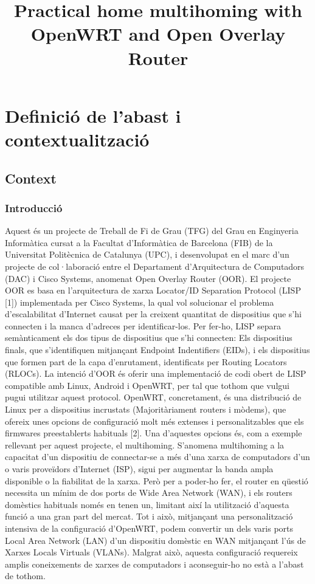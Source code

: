 \documentclass{article}
\begin{document}
\title{Practical home multihoming with OpenWRT and Open Overlay Router}
\maketitle
\tableofcontents
\section{Definició de l’abast i contextualització}
\subsection{Context}
\subsubsection{Introducció}
Aquest és un projecte de Treball de Fi de Grau (TFG) del Grau en Enginyeria Informàtica cursat a la Facultat d’Informàtica de Barcelona (FIB) de la Universitat Politècnica de Catalunya (UPC), i desenvolupat en el marc d’un projecte de col·laboració entre el Departament d’Arquitectura de Computadors (DAC) i Cisco Systems, anomenat Open Overlay Router (OOR).
El projecte OOR es basa en l’arquitectura de xarxa Locator/ID Separation Protocol (LISP [1]) implementada per Cisco Systems, la qual vol solucionar el problema d’escalabilitat d’Internet causat per la creixent quantitat de dispositius que s’hi connecten i la manca d’adreces per identificar-los. Per fer-ho, LISP separa semànticament els dos tipus de dispositius que s’hi connecten: Els dispositius finals, que s’identifiquen mitjançant Endpoint Indentifiers (EIDs), i els dispositius que formen part de la capa d’enrutament, identificats per Routing Locators (RLOCs).
La intenció d’OOR és oferir una implementació de codi obert de LISP compatible amb Linux, Android i OpenWRT, per tal que tothom que vulgui pugui utilitzar aquest protocol.
OpenWRT, concretament, és una distribució de Linux per a dispositius incrustats (Majoritàriament routers i mòdems), que ofereix unes opcions de configuració molt més extenses i personalitzables que els firmwares preestablerts habituals [2]. Una d’aquestes opcions és, com a exemple rellevant per aquest projecte, el multihoming.
S’anomena multihoming a la capacitat d’un dispositiu de connectar-se a més d’una xarxa de computadors d’un o varis proveïdors d’Internet (ISP), sigui per augmentar la banda ampla disponible o la fiabilitat de la xarxa. Però per a poder-ho fer, el router en qüestió necessita un mínim de dos ports de Wide Area Network (WAN), i els routers domèstics habituals només en tenen un, limitant així la utilització d’aquesta funció a una gran part del mercat. Tot i això, mitjançant una personalització intensiva de la configuració d’OpenWRT, podem convertir un dels varis ports Local Area Network (LAN) d’un dispositiu domèstic en WAN mitjançant l’ús de Xarxes Locals Virtuals (VLANs). Malgrat això, aquesta configuració requereix amplis coneixements de xarxes de computadors i aconseguir-ho no està a l’abast de tothom.
\end{document}
